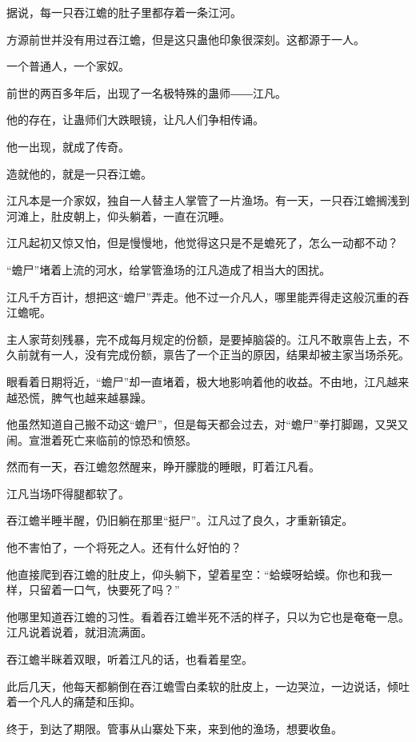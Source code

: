 
\begin{this_body}

据说，每一只吞江蟾的肚子里都存着一条江河。

方源前世并没有用过吞江蟾，但是这只蛊他印象很深刻。这都源于一人。

一个普通人，一个家奴。

前世的两百多年后，出现了一名极特殊的蛊师――江凡。

他的存在，让蛊师们大跌眼镜，让凡人们争相传诵。

他一出现，就成了传奇。

造就他的，就是一只吞江蟾。

江凡本是一介家奴，独自一人替主人掌管了一片渔场。有一天，一只吞江蟾搁浅到河滩上，肚皮朝上，仰头躺着，一直在沉睡。

江凡起初又惊又怕，但是慢慢地，他觉得这只是不是蟾死了，怎么一动都不动？

“蟾尸”堵着上流的河水，给掌管渔场的江凡造成了相当大的困扰。

江凡千方百计，想把这“蟾尸”弄走。他不过一介凡人，哪里能弄得走这般沉重的吞江蟾呢。

主人家苛刻残暴，完不成每月规定的份额，是要掉脑袋的。江凡不敢禀告上去，不久前就有一人，没有完成份额，禀告了一个正当的原因，结果却被主家当场杀死。

眼看着日期将近，“蟾尸”却一直堵着，极大地影响着他的收益。不由地，江凡越来越恐慌，脾气也越来越暴躁。

他虽然知道自己搬不动这“蟾尸”，但是每天都会过去，对“蟾尸”拳打脚踢，又哭又闹。宣泄着死亡来临前的惊恐和愤怒。

然而有一天，吞江蟾忽然醒来，睁开朦胧的睡眼，盯着江凡看。

江凡当场吓得腿都软了。

吞江蟾半睡半醒，仍旧躺在那里“挺尸”。江凡过了良久，才重新镇定。

他不害怕了，一个将死之人。还有什么好怕的？

他直接爬到吞江蟾的肚皮上，仰头躺下，望着星空：“蛤蟆呀蛤蟆。你也和我一样，只留着一口气，快要死了吗？”

他哪里知道吞江蟾的习性。看着吞江蟾半死不活的样子，只以为它也是奄奄一息。江凡说着说着，就泪流满面。

吞江蟾半眯着双眼，听着江凡的话，也看着星空。

此后几天，他每天都躺倒在吞江蟾雪白柔软的肚皮上，一边哭泣，一边说话，倾吐着一个凡人的痛楚和压抑。

终于，到达了期限。管事从山寨处下来，来到他的渔场，想要收鱼。


\end{this_body}
